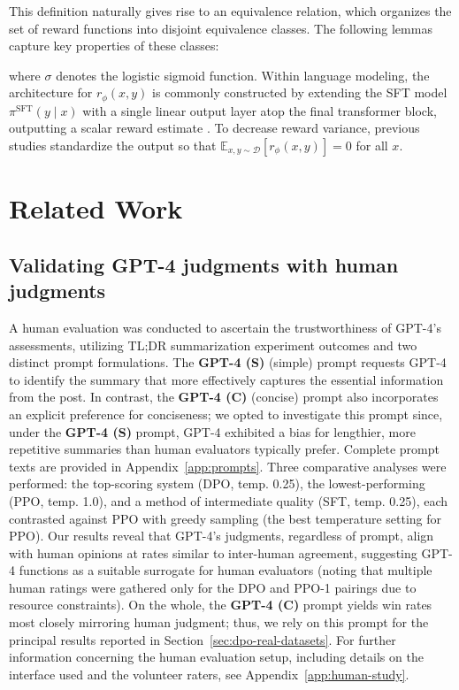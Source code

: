 This definition naturally gives rise to an equivalence relation, which organizes the set of reward functions into disjoint equivalence classes. The following lemmas capture key properties of these classes:

where $\sigma$ denotes the logistic sigmoid function. Within language modeling, the architecture for $r_{\phi}(x, y)$ is commonly constructed by extending the SFT model $\pi^\text{SFT}(y \mid x)$ with a single linear output layer atop the final transformer block, outputting a scalar reward estimate \cite{ziegler2020finetuning}. To decrease reward variance, previous studies standardize the output so that $\mathbb{E}_{x,y\sim \mathcal{D}}\left[r_\phi(x, y)\right] = 0$ for all $x$.

\section{Related Work}

\subsection{Validating GPT-4 judgments with human judgments}
\label{sec:human-judgments}
A human evaluation was conducted to ascertain the trustworthiness of GPT-4’s assessments, utilizing TL;DR summarization experiment outcomes and two distinct prompt formulations. The \textbf{GPT-4 (S)} (simple) prompt requests GPT-4 to identify the summary that more effectively captures the essential information from the post. In contrast, the \textbf{GPT-4 (C)} (concise) prompt also incorporates an explicit preference for conciseness; we opted to investigate this prompt since, under the \textbf{GPT-4 (S)} prompt, GPT-4 exhibited a bias for lengthier, more repetitive summaries than human evaluators typically prefer. Complete prompt texts are provided in Appendix~\ref{app:prompts}. Three comparative analyses were performed: the top-scoring system (DPO, temp. 0.25), the lowest-performing (PPO, temp. 1.0), and a method of intermediate quality (SFT, temp. 0.25), each contrasted against PPO with greedy sampling (the best temperature setting for PPO). Our results reveal that GPT-4’s judgments, regardless of prompt, align with human opinions at rates similar to inter-human agreement, suggesting GPT-4 functions as a suitable surrogate for human evaluators (noting that multiple human ratings were gathered only for the DPO and PPO-1 pairings due to resource constraints). On the whole, the \textbf{GPT-4 (C)} prompt yields win rates most closely mirroring human judgment; thus, we rely on this prompt for the principal results reported in Section~\ref{sec:dpo-real-datasets}. For further information concerning the human evaluation setup, including details on the interface used and the volunteer raters, see Appendix~\ref{app:human-study}.

